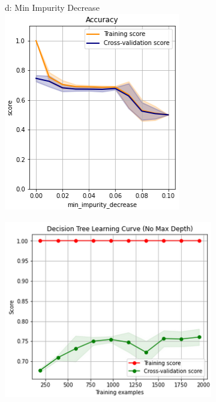 \documentclass{article}
\begin{document}
\begin{figure}
\begin{subfigure}{.24\textwidth}
	\end{subfigure}
	\begin{subfigure}{.24\textwidth}
		d: Min Impurity Decrease
	\centering
	\includegraphics[width=\linewidth]{poland_decision_min_impurity_decrease_accuracy.png}
	
	\end{subfigure}
	\begin{subfigure}{.38\textwidth}
		\centering
		\includegraphics[width=\linewidth]{poland_decision_learning_curve_without_max_depth.png}
		

\end{subfigure}
\end{figure}
\end{document}
